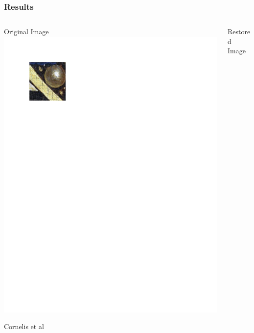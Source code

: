 \documentclass{beamer}
\begin{document}
\begin{frame}
\frametitle[Results]{Results}
\begin{columns}
\begin{column}{0.5\textwidth}
Original Image
\includegraphics[width=1\textwidth,trim={0.5in 8.4in 5.5in 0.75in},clip]{ghent_altarpiece_original}
\begin{center}
{\tiny Cornelis et al}
\end{center}
\end{column}
\begin{column}{0.5\textwidth}
Restored Image

\end{column}
\end{columns}
\end{frame}
\end{document}

